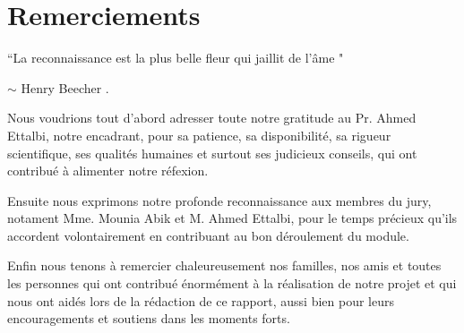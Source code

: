 
\chapter*{Remerciements}



\begin{center}
``La reconnaissance est la plus belle fleur qui jaillit de l'âme "
\end{center}
\begin{center} $\sim$ Henry Beecher . \end{center}
Nous voudrions tout d'abord adresser toute notre gratitude au 
Pr. Ahmed Ettalbi, notre encadrant, pour sa patience, sa disponibilité, sa rigueur scientifique, ses qualités humaines
et surtout ses judicieux conseils, qui ont contribué à alimenter notre
réfexion.

Ensuite nous exprimons notre profonde reconnaissance aux membres du jury, notament Mme. Mounia Abik et M. Ahmed Ettalbi, pour le temps précieux qu'ils accordent volontairement en contribuant au bon déroulement du module.

Enfin nous tenons à remercier chaleureusement nos familles, nos amis et toutes les personnes qui ont contribué énormément à la réalisation de notre projet et qui nous ont aidés lors de la rédaction de ce rapport, aussi bien pour leurs encouragements et soutiens dans les moments forts.

